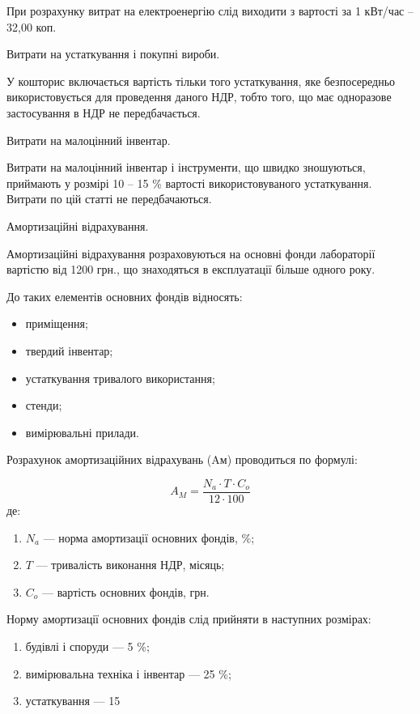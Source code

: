 При розрахунку витрат на електроенергію слід виходити з вартості за 1 кВт/час – 32,00 коп.

Витрати на устаткування і покупні вироби. 

У кошторис включається вартість тільки того устаткування, яке безпосередньо використовується для проведення даного НДР, тобто того, що має одноразове застосування в НДР не передбачається.

Витрати на малоцінний інвентар. 

Витрати на малоцінний інвентар і інструменти, що швидко зношуються, приймають у розмірі 10 – 15 \% вартості використовуваного устаткування. Витрати по цій статті не передбачаються.

Амортизаційні відрахування.

Амортизаційні відрахування розраховуються на основні фонди лабораторії вартістю від 1200 грн., що знаходяться в експлуатації більше одного року.

До таких елементів основних фондів відносять:
\begin{itemize}
\item приміщення;
\item твердий інвентар;
\item устаткування тривалого використання;
\item стенди;
\item вимірювальні прилади.
\end{itemize}

Розрахунок амортизаційних відрахувань (Aм) проводиться по формулі:

\begin{equation}
A_M = \frac{N_a   \cdot   T   \cdot   C_o}{12  \cdot  100} \nonumber
\end{equation}
де:
\begin{enumerate}
\item $N_a$ --- норма амортизації основних фондів, \%;
\item $T$ --- тривалість виконання НДР, місяць;
\item $C_o$ --- вартість основних фондів, грн.
\end{enumerate}

Норму амортизації основних фондів слід прийняти в наступних розмірах:

\begin{enumerate}
\item будівлі і споруди --- 5 \%;
\item вимірювальна техніка і інвентар --- 25 \%;
\item устаткування --- 15 %
\end{enumerate}

